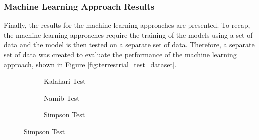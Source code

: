 \subsubsection*{Machine Learning Approach Results}

Finally, the results for the machine learning approaches are presented. To recap, the machine learning approaches require the training of the models using a set of data and the model is then tested on a separate set of data. Therefore, a separate set of data was created to evaluate the performance of the machine learning approach, shown in Figure \ref{fig:terrestrial_test_dataset}.

\begin{figure}
	\centering
	\begin{subfigure}{\textwidth}
		\centering
		\caption{ Kalahari Test }
		\label{fig:kalahari_test_image}
	\end{subfigure}
	\begin{subfigure}{\textwidth}
		\centering
		\caption{ Namib Test }
		\label{fig:namib_test_image}
	\end{subfigure}
	\begin{subfigure}{\textwidth}
		\centering
		\caption{ Simpson Test }
		\label{fig:simpson_test_image}
	\end{subfigure}
\end{figure}
